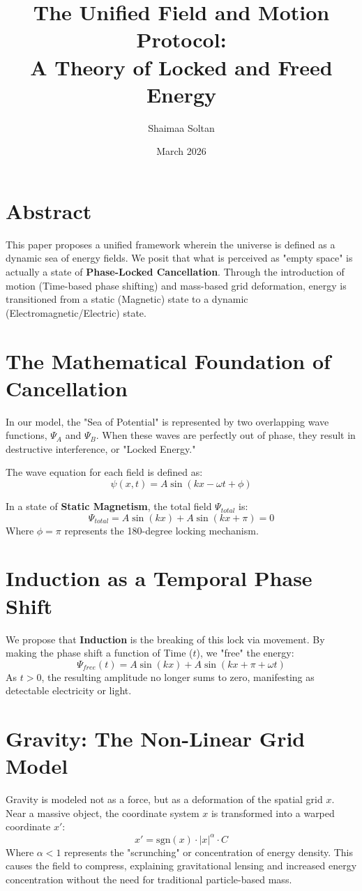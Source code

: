 \documentclass[11pt]{article}
\title{\textbf{The Unified Field and Motion Protocol: \\ A Theory of Locked and Freed Energy}}
\author{Shaimaa Soltan}
\date{March 2026}
\begin{document}
\maketitle

\section{Abstract}
This paper proposes a unified framework wherein the universe is defined as a dynamic sea of energy fields. We posit that what is perceived as "empty space" is actually a state of \textbf{Phase-Locked Cancellation}. Through the introduction of motion (Time-based phase shifting) and mass-based grid deformation, energy is transitioned from a static (Magnetic) state to a dynamic (Electromagnetic/Electric) state.

\section{The Mathematical Foundation of Cancellation}
In our model, the "Sea of Potential" is represented by two overlapping wave functions, $\Psi_A$ and $\Psi_B$. When these waves are perfectly out of phase, they result in destructive interference, or "Locked Energy."

The wave equation for each field is defined as:
\begin{equation}
\psi(x, t) = A \sin(kx - \omega t + \phi)
\end{equation}

In a state of \textbf{Static Magnetism}, the total field $\Psi_{total}$ is:
\begin{equation}
\Psi_{total} = A \sin(kx) + A \sin(kx + \pi) = 0
\end{equation}
Where $\phi = \pi$ represents the 180-degree locking mechanism.

\section{Induction as a Temporal Phase Shift}
We propose that \textbf{Induction} is the breaking of this lock via movement. By making the phase shift a function of Time ($t$), we "free" the energy:
\begin{equation}
\Psi_{free}(t) = A \sin(kx) + A \sin(kx + \pi + \omega t)
\end{equation}
As $t > 0$, the resulting amplitude no longer sums to zero, manifesting as detectable electricity or light.

\section{Gravity: The Non-Linear Grid Model}
Gravity is modeled not as a force, but as a deformation of the spatial grid $x$. Near a massive object, the coordinate system $x$ is transformed into a warped coordinate $x'$:
\begin{equation}
x' = \text{sgn}(x) \cdot |x|^\alpha \cdot C
\end{equation}
Where $\alpha < 1$ represents the "scrunching" or concentration of energy density. This causes the field to compress, explaining gravitational lensing and increased energy concentration without the need for traditional particle-based mass.
\end{document}
